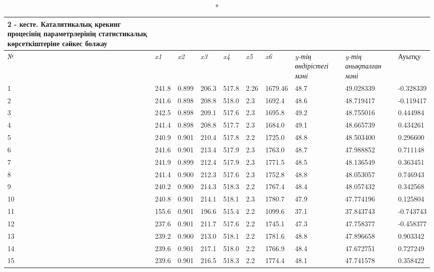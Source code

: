 \begin{longtable}[c]{|l|l|l|l|l|l|l|l|l|l|}
\caption*{2 - кесте. Каталитикалық крекинг процесінің параметрлерінің
статистикалық көрсеткіштеріне сәйкес болжау} \\
\hline
№ & \textit{x1} & \textit{x2} & \textit{x3} & \textit{x4} & \textit{x5} & \textit{x6} & \begin{minipage}{1.5cm}\textit{y-тің өндірістегі мәні}\end{minipage} & \begin{minipage}{1.5cm}\textit{y-тің анықталған мәні}\end{minipage} & Ауытқу \\ \hline
\endfirsthead
%
\endhead
%
1  & 241.8 & 0.899 & 206.3 & 517.8 & 2.26 & 1679.46 & 48.7 & 49.028339 & -0.328339 \\ \hline
2  & 241.6 & 0.898 & 208.8 & 518.0 & 2.3  & 1692.4  & 48.6 & 48.719417 & -0.119417 \\ \hline
3  & 242.5 & 0.898 & 209.1 & 517.6 & 2.3  & 1695.8  & 49.2 & 48.755016 & 0.444984  \\ \hline
4  & 241.4 & 0.898 & 208.8 & 517.7 & 2.3  & 1684.0  & 49.1 & 48.665739 & 0.434261  \\ \hline
5  & 240.9 & 0.901 & 210.4 & 517.8 & 2.2  & 1725.0  & 48.8 & 48.503400 & 0.296600  \\ \hline
6  & 241.6 & 0.901 & 213.4 & 517.9 & 2.3  & 1763.0  & 48.7 & 47.988852 & 0.711148  \\ \hline
7  & 241.9 & 0.899 & 212.4 & 517.9 & 2.3  & 1771.5  & 48.5 & 48.136549 & 0.363451  \\ \hline
8  & 241.4 & 0.900 & 212.3 & 517.6 & 2.3  & 1752.8  & 48.8 & 48.053057 & 0.746943  \\ \hline
9  & 240.2 & 0.900 & 214.3 & 518.3 & 2.2  & 1767.4  & 48.4 & 48.057432 & 0.342568  \\ \hline
10 & 240.8 & 0.901 & 214.1 & 518.1 & 2.3  & 1780.7  & 47.9 & 47.774196 & 0.125804  \\ \hline
11 & 155.6 & 0.901 & 196.6 & 515.4 & 2.2  & 1099.6  & 37.1 & 37.843743 & -0.743743 \\ \hline
12 & 237.6 & 0.901 & 211.7 & 517.6 & 2.2  & 1745.1  & 47.3 & 47.758377 & -0.458377 \\ \hline
13 & 239.2 & 0.900 & 213.0 & 518.1 & 2.2  & 1781.6  & 48.8 & 47.896658 & 0.903342  \\ \hline
14 & 239.6 & 0.901 & 217.1 & 518.0 & 2.2  & 1766.9  & 48.4 & 47.672751 & 0.727249  \\ \hline
15 & 239.6 & 0.901 & 216.5 & 518.3 & 2.2  & 1774.4  & 48.1 & 47.741578 & 0.358422  \\ \hline

\end{longtable}
